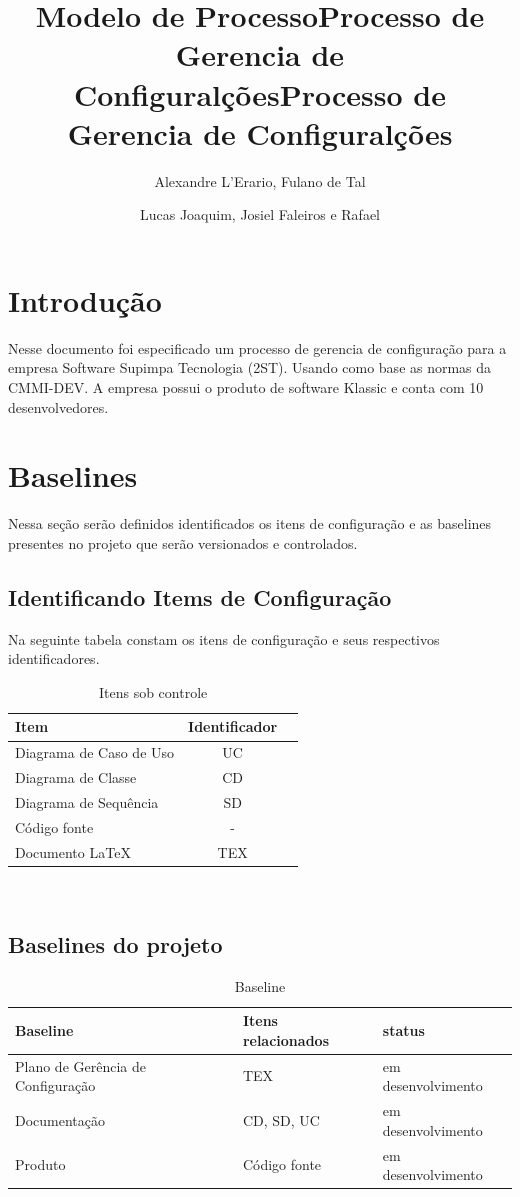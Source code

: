 \documentclass{article}
\title{Modelo de Processo}
\title{Processo de Gerencia de Configuralções}
\author{Alexandre L'Erario, Fulano de Tal }  	%
\date{}
\title{Processo de Gerencia de Configuralções}
\author{Lucas Joaquim, Josiel Faleiros e Rafael }
\begin{document}
	\maketitle
	\newpage
	\tableofcontents
	\newpage
	\section{Introdução}
    Nesse documento foi especificado um processo de gerencia de configuração para a empresa Software Supimpa Tecnologia (2ST). Usando como base as normas da CMMI-DEV. A empresa possui o produto de software Klassic e conta com 10 desenvolvedores.
    \section{Baselines}
	    Nessa seção serão definidos identificados os itens de configuração e as baselines presentes no projeto que serão versionados e controlados.
	    \subsection{Identificando Items de Configuração}
          Na seguinte tabela constam os itens de configuração e seus respectivos identificadores.
	  	\begin{table}[H]
			\begin{tabular}{l c r}
                  \textbf{Item} & \textbf{Identificador}\\
                  \hline
                  Diagrama de Caso de Uso & UC \\
                  Diagrama de Classe & CD \\
                  Diagrama de Sequência  & SD \\
                  Código fonte  & -\\
                  Documento LaTeX & TEX \\
              \end{tabular}\\
              \caption{Itens sob controle}
          \end{table}
          \subsection{Baselines do projeto}
          \begin{table}[H]
              \begin{tabular}{l l l}
                  \textbf{Baseline} & \textbf{Itens relacionados} & \textbf{status}\\
                  \hline
                  Plano de Gerência de Configuração & TEX & em desenvolvimento \\
                  Documentação & CD, SD, UC & em desenvolvimento \\
                  Produto & Código fonte & em desenvolvimento\\
              \end{tabular}\\
              \caption{Baseline}
          \end{table}
\end{document}

